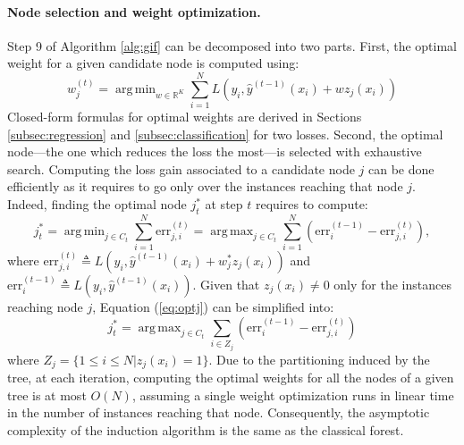 \documentclass{article}
\DeclareMathOperator*{\argmin}{arg\,min}
\DeclareMathOperator*{\argmax}{arg\,max}
\begin{document}
\paragraph{Node selection and weight optimization.}
Step 9 of Algorithm \ref{alg:gif} can be decomposed into two parts. First,
the optimal weight for a given candidate node is computed using:
\begin{equation}\label{eq:nodeSel}
  w^{(t)}_j = \argmin_{w\in \mathbb{R}^K} \sum_{i=1}^N L\left(y_i, 
  \hat{y}^{(t-1)}(x_i) + w z_j(x_i)  \right)
\end{equation}
Closed-form formulas for optimal weights are derived in Sections
\ref{subsec:regression} and \ref{subsec:classification} for two losses. Second,
the optimal node---the one which reduces the loss the most---is selected with
exhaustive search. Computing the loss gain associated to a candidate node $j$
can be done efficiently as it requires to go only over the instances reaching
that node $j$. Indeed, finding the optimal node $j_t^*$ at step $t$ requires to 
compute:
\begin{equation}\label{eq:optj}
  j_t^* = \argmin_{j \in C_t} \sum_{i=1}^N \text{err}_{j,i}^{(t)} = \argmax_{j 
  \in C_t} 
  \sum_{i=1}^N (\text{err}^{(t-1)}_i - \text{err}_{j,i}^{(t)}),
\end{equation}
where $\text{err}_{j,i}^{(t)}\triangleq L(y_i,\hat{y}^{(t-1)}(x_i) + w_j^* z_j(x_i))$ and $\text{err}^{(t-1)}_i\triangleq L(y_i,\hat{y}^{(t-1)}(x_i))$.
Given that $z_j(x_i)\neq 0$ only for the instances reaching node $j$, Equation 
(\ref{eq:optj}) can be simplified into:
\begin{equation}\label{eq:optj2}
  j_t^* = \argmax_{j \in C_t} \sum_{i\in Z_j} (\text{err}^{(t-1)}_i - 
  \text{err}_{j,i}^{(t)})
\end{equation}
where $Z_j = \{1 \leq i \leq N | z_j (x_i)=1 \}$. Due to the partitioning
induced by the tree, at each iteration, computing the optimal
weights for all the nodes of a given tree is at most $O(N)$, assuming a single
weight optimization runs in linear time in the number of instances reaching
that node. Consequently, the asymptotic complexity of the induction algorithm 
is the same as the classical forest.
\end{document}
